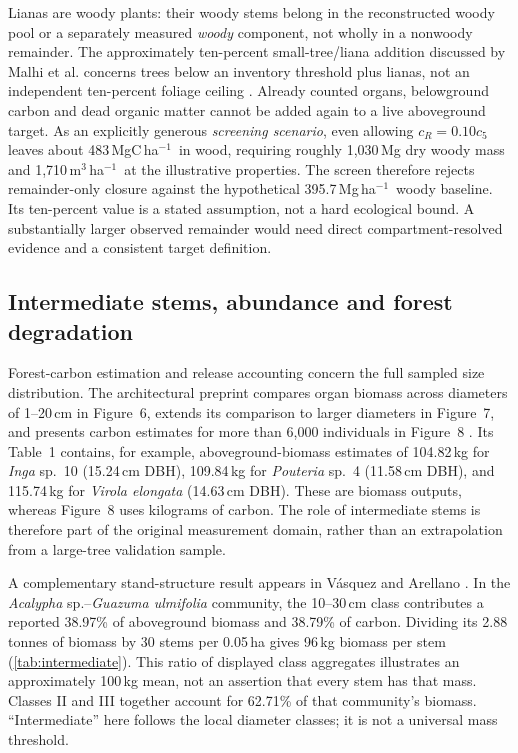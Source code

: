 \documentclass[11pt,a4paper]{article}
\theoremstyle{remark}
\begin{document}
Lianas are woody plants: their woody stems belong in the reconstructed woody pool or a separately measured \emph{woody} component, not wholly in a nonwoody remainder. The approximately ten-percent small-tree/liana addition discussed by Malhi et al. concerns trees below an inventory threshold plus lianas, not an independent ten-percent foliage ceiling \citep{Malhi2006}. Already counted organs, belowground carbon and dead organic matter cannot be added again to a live aboveground target. As an explicitly generous \emph{screening scenario}, even allowing $c_R=0.10c_5$ leaves about 483\,MgC\,ha$^{-1}$\ in wood, requiring roughly 1,030\,Mg dry woody mass and 1,710\,m$^3$\,ha$^{-1}$\ at the illustrative properties. The screen therefore rejects remainder-only closure against the hypothetical 395.7\,Mg\,ha$^{-1}$\ woody baseline. Its ten-percent value is a stated assumption, not a hard ecological bound. A substantially larger observed remainder would need direct compartment-resolved evidence and a consistent target definition.

\subsection{Intermediate stems, abundance and forest degradation}\label{sec:allsize}
Forest-carbon estimation and release accounting concern the full sampled size distribution. The architectural preprint compares organ biomass across diameters of 1--20\,cm in Figure~6, extends its comparison to larger diameters in Figure~7, and presents carbon estimates for more than 6,000 individuals in Figure~8 \citep[pp.~20--22, Figs.~6--8]{Arellano2016}. Its Table~1 contains, for example, aboveground-biomass estimates of 104.82\,kg for \textit{Inga} sp.~10 (15.24\,cm DBH), 109.84\,kg for \textit{Pouteria} sp.~4 (11.58\,cm DBH), and 115.74\,kg for \textit{Virola elongata} (14.63\,cm DBH). These are biomass outputs, whereas Figure~8 uses kilograms of carbon. The role of intermediate stems is therefore part of the original measurement domain, rather than an extrapolation from a large-tree validation sample.

A complementary stand-structure result appears in V\'asquez and Arellano \citep[Table~170, p.~942]{Vasquez2012}. In the \textit{Acalypha} sp.--\textit{Guazuma ulmifolia} community, the 10--30\,cm class contributes a reported 38.97\% of aboveground biomass and 38.79\% of carbon. Dividing its 2.88 tonnes of biomass by 30 stems per 0.05\,ha gives 96\,kg biomass per stem (\cref{tab:intermediate}). This ratio of displayed class aggregates illustrates an approximately 100\,kg mean, not an assertion that every stem has that mass. Classes II and III together account for 62.71\% of that community's biomass. ``Intermediate'' here follows the local diameter classes; it is not a universal mass threshold.
\end{document}

